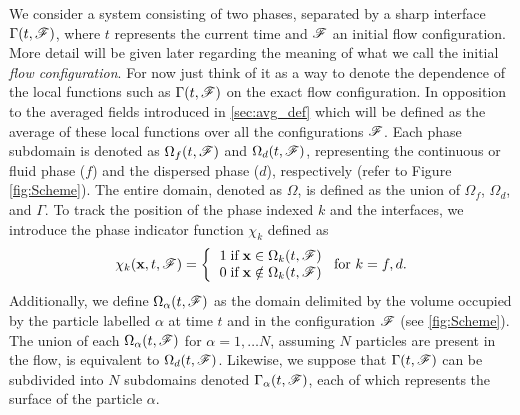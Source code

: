 We consider a system consisting of two phases, separated by a sharp interface $\Gamma(t,\mathscr{F})$,
where $t$ represents the current time and $\mathscr{F}$ an initial flow configuration. 
More detail will be given later regarding the meaning of what we call the initial \textit{flow configuration}. 
For now just think of it as a way to denote the dependence of the local functions such as $\Gamma(t,\mathscr{F})$ on the exact flow configuration. 
In opposition to the averaged fields introduced in \ref{sec:avg_def} which will be defined as the average of these local functions over all the configurations $\mathscr{F}$. 
Each phase subdomain is denoted as $\Omega_f(t,\mathscr{F})$ and $\Omega_d(t,\mathscr{F})$, representing the continuous or fluid phase ($f$) and the dispersed phase ($d$), respectively (refer to Figure \ref{fig:Scheme}).
The entire domain, denoted as $\Omega$, is defined as the union of $\Omega_f$, $\Omega_d$, and $\Gamma$.
To track the position of the phase indexed $k$ and the interfaces, we introduce the phase indicator function $\chi_k$ defined as
\begin{align}
    \chi_k(\textbf{x},t,\FF) =  \left\{
      \begin{tabular}{cc}
        $1 \;\text{if} \;\textbf{x} \in \Omega_k(t,\FF)$\\
        $0 \;\text{if} \;\textbf{x} \notin \Omega_k(t,\FF)$
      \end{tabular}
      \right.
      \text{for $k = f,d$}.
      \label{eq:PIF}
\end{align}
Additionally, we define $\Omega_\alpha(t,\mathscr{F})$ as the domain delimited by the volume occupied by the particle labelled $\alpha$ at time $t$ and in the configuration $\mathscr{F}$ (see \ref{fig:Scheme}). 
The union of each $\Omega_\alpha(t,\mathscr{F})$ for $\alpha = 1,\ldots N$, assuming $N$ particles are present in the flow, is equivalent to $\Omega_d(t,\mathscr{F})$.
Likewise, we suppose that $\Gamma(t,\mathscr{F})$ can be subdivided into $N$ subdomains denoted $\Gamma_\alpha(t,\mathscr{F})$, each of which represents the surface of the particle $\alpha$. 


